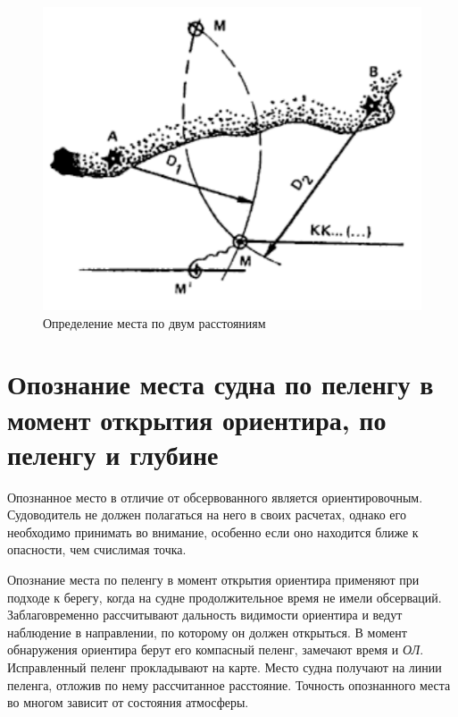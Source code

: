 \documentclass[a4paper, 12pt, twoside, final, book, russian, fittopage, cyremdash]{ncc}
\begin{document}
\begin{figure}[htb]
  \centering{}
  \includegraphics{N050}
  \caption{Определение места по двум расстояниям}
  \label{fig:N50}
\end{figure} 

\section{Опознание места судна по пеленгу в момент открытия ориентира, по пеленгу и глубине}

Опознанное место в отличие от обсервованного является ориентировочным. Судоводитель не должен полагаться на него в своих расчетах, однако его необходимо принимать во внимание, особенно если оно находится ближе к опасности, чем счислимая точка. 

Опознание места по пеленгу в момент открытия ориентира применяют при подходе к берегу, когда на судне продолжительное время не имели обсерваций. Заблаговременно рассчитывают дальность видимости ориентира и ведут наблюдение в направлении, по которому он должен открыться. В момент обнаружения ориентира берут его компасный пеленг, замечают время и \textit{ОЛ}. Исправленный пеленг прокладывают на карте. Место судна получают на линии пеленга, отложив по нему рассчитанное расстояние. Точность опознанного места во многом зависит от состояния атмосферы. 
\end{document}
